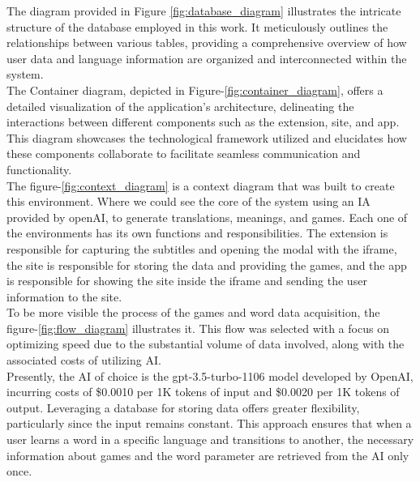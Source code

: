 \documentclass[12pt]{article}
\begin{document}
The diagram provided in Figure \ref{fig:database_diagram} illustrates the intricate structure of the database employed in this work. It meticulously outlines the relationships between various tables, providing a comprehensive overview of how user data and language information are organized and interconnected within the system. \\
The Container diagram, depicted in Figure-\ref{fig:container_diagram}, offers a detailed visualization of the application's architecture, delineating the interactions between different components such as the extension, site, and app. This diagram showcases the technological framework utilized and elucidates how these components collaborate to facilitate seamless communication and functionality. \\
The figure-\ref{fig:context_diagram} is a context diagram that was built to create this environment. Where we could see the core of the system using an IA provided by openAI, to generate translations, meanings, and games. Each one of the environments has its own functions and responsibilities. The extension is responsible for capturing the subtitles and opening the modal with the iframe, the site is responsible for storing the data and providing the games, and the app is responsible for showing the site inside the iframe and sending the user information to the site. \\
To be more visible the process of the games and word data acquisition, the figure-\ref{fig:flow_diagram} illustrates it. This flow was selected with a focus on optimizing speed due to the substantial volume of data involved, along with the associated costs of utilizing AI. \\
Presently, the AI of choice is the gpt-3.5-turbo-1106 model developed by OpenAI, incurring costs of \$0.0010 per 1K tokens of input and \$0.0020 per 1K tokens of output. Leveraging a database for storing data offers greater flexibility, particularly since the input remains constant. This approach ensures that when a user learns a word in a specific language and transitions to another, the necessary information about games and the word parameter are retrieved from the AI only once. 
\end{document}
